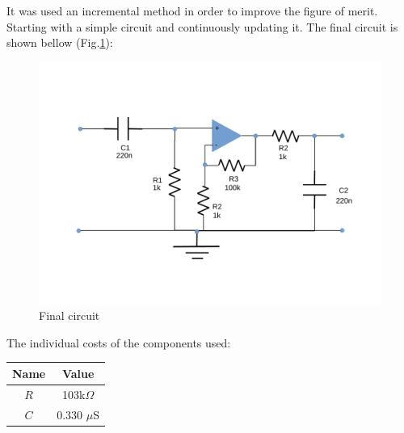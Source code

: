 It was used an incremental method in order to improve the figure of merit. Starting with a simple circuit and continuously updating it. The final circuit is shown bellow (Fig.\ref{fig:circuito}): \par

\begin{figure}[H]
\centering
\includegraphics[width=0.9\linewidth]{circuito}
\caption{Final circuit}
\label{fig:circuito}
\end{figure}

The individual costs of the components used: 

\begin{center}
  \begin{tabular}{ | c | c | }
    \hline    
    {\bf Name} & {\bf Value} \\ \hline
    $R$ & 103k$\Omega$ \\ \hline 
    $C$ & 0.330 $\mu$S \\ 
    \hline
  \end{tabular}
\end{center}

\newpage
